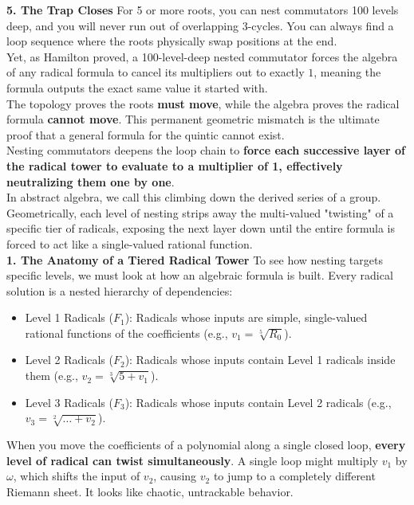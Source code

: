 {\bf 5. The Trap Closes}
For 5 or more roots, you can nest commutators 100 levels deep, and you will never run out of overlapping 3-cycles. 
You can always find a loop sequence where the roots physically swap positions at the end.\\

Yet, as Hamilton proved, a 100-level-deep nested commutator forces the algebra of any radical formula to cancel its multipliers out to exactly \(1\), 
meaning the formula outputs the exact same value it started with.\\

The topology proves the roots {\bf must move}, while the algebra proves the radical formula {\bf cannot move}.
This permanent geometric mismatch is the ultimate proof that a general formula for the quintic cannot exist.\\


Nesting commutators deepens the loop chain to {\bf force each successive layer of the radical tower to evaluate to a multiplier of 1, effectively neutralizing them one by one}.\\

In abstract algebra, we call this climbing down the derived series of a group. Geometrically, each level of nesting strips away the multi-valued "twisting" of a specific tier of radicals, exposing the next layer down until the entire formula is forced to act like a single-valued rational function.\\

{\bf 1. The Anatomy of a Tiered Radical Tower}
To see how nesting targets specific levels, we must look at how an algebraic formula is built. Every radical solution is a nested hierarchy of dependencies:
\begin{itemize}
\item[]Level 1 Radicals (\(F_{1}\)): Radicals whose inputs are simple, single-valued rational functions of the coefficients (e.g., \(v_1 = \sqrt[5]{R_0}\)).
\item[]Level 2 Radicals (\(F_{2}\)): Radicals whose inputs contain Level 1 radicals inside them (e.g., \(v_2 = \sqrt[3]{5 + v_1}\)).
\item[]Level 3 Radicals (\(F_{3}\)): Radicals whose inputs contain Level 2 radicals (e.g., \(v_3 = \sqrt[2]{\dots + v_2}\)).
\end{itemize}
When you move the coefficients of a polynomial along a single closed loop, {\bf every level of radical can twist simultaneously}. 
A single loop might multiply \(v_{1}\) by \(\omega \), which shifts the input of \(v_{2}\), causing \(v_{2}\) to jump to a completely different Riemann sheet. It looks like chaotic, untrackable behavior.\\

